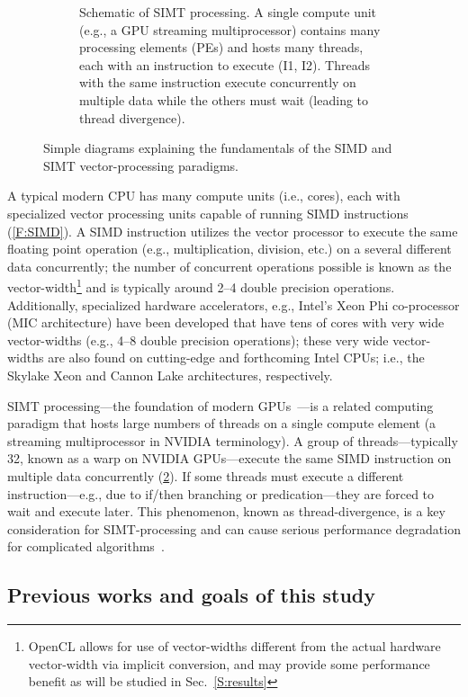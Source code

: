 \documentclass[12pt,number,sort&compress,preprint]{elsarticle}
\begin{document}
\begin{figure}[htb]
\begin{subfigure}[t]{0.45\linewidth}
      \caption{Schematic of SIMT processing. A single compute unit (e.g., a GPU streaming multiprocessor) contains many processing elements (PEs) and hosts many threads, each with an instruction to execute (I1, I2).  Threads with the same instruction execute concurrently on multiple data while the others must wait (leading to thread divergence).}
      \label{F:SIMT}
  \end{subfigure}
  \caption{Simple diagrams explaining the fundamentals of the SIMD and SIMT vector-processing paradigms.}
\end{figure}

A typical modern CPU has many compute units (i.e., cores), each with specialized vector processing units capable of running SIMD instructions (\cref{F:SIMD}).
A SIMD instruction utilizes the vector processor to execute the same floating point operation (e.g., multiplication, division, etc.) on a several different data concurrently; the number of concurrent operations possible is known as the vector-width\footnote{OpenCL allows for use of vector-widths different from the actual hardware vector-width via implicit conversion, and may provide some performance benefit as will be studied in Sec.~\ref{S:results}} and is typically around 2--4 double precision operations. 
Additionally, specialized hardware accelerators, e.g., Intel's Xeon Phi co-processor (MIC architecture) have been developed that have tens of cores with very wide vector-widths (e.g., \numrange{4}{8} double precision operations); these very wide vector-widths are also found on cutting-edge and forthcoming Intel CPUs; i.e., the Skylake Xeon and Cannon Lake architectures, respectively.

SIMT processing---the foundation of modern GPUs~\cite{lindholm2008nvidia}---is a related computing paradigm that hosts large numbers of threads on a single compute element (a streaming multiprocessor in NVIDIA terminology).
A group of threads---typically \num{32}, known as a warp on NVIDIA GPUs---execute the same SIMD instruction on multiple data concurrently (\cref{F:SIMT}).
If some threads must execute a different instruction---e.g., due to if\slash then branching or predication---they are forced to wait and execute later.
This phenomenon, known as thread-divergence, is a key consideration for SIMT-processing and can cause serious performance degradation for complicated algorithms~\cite{CurtisGPU:2017}.

\subsection{Previous works and goals of this study}
\label{S:Goals}
\end{document}
